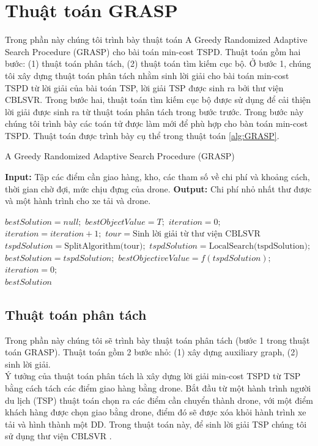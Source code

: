 \documentclass[a4paper,12pt]{report}
\begin{document}
\section{Thuật toán GRASP}
\label{section:grasp}
Trong phần này chúng tôi trình bày thuật toán A Greedy Randomized Adaptive Search Procedure (GRASP) cho bài toán min-cost TSPD. Thuật toán gồm hai bước: (1) thuật toán phân tách, (2) thuật toán tìm kiếm cục bộ. Ở bước 1, chúng tôi xây dựng thuật toán phân tách nhằm sinh lời giải cho bài toán min-cost TSPD từ lời giải của bài toán TSP, lời giải TSP được sinh ra bởi thư viện CBLSVR. Trong bước hai, thuật toán tìm kiếm cục bộ được sử dụng để cải thiện lời giải được sinh ra từ thuật toán phân tách trong bước trước. Trong bước này chúng tôi trình bày các toán tử được làm mới để phù hợp cho bàn toán min-cost TSPD. Thuật toán được trình bày cụ thể trong thuật toán \ref{alg:GRASP}.
\begin{algorithm}[H]
\caption{A Greedy Randomized Adaptive Search Procedure (GRASP)}
\textbf{Input:} Tập các điểm cần giao hàng, kho, các tham số về chi phí và khoảng cách, thời gian chờ đợi, mức chịu đựng của drone.
\textbf{Output:} Chi phí nhỏ nhất thư được và một hành trình cho xe tải và drone.
\begin{algorithmic}[1]
\State $bestSolution=null;$
\State $bestObjectValue=T;$
\State $iteration=0;$
\State $iteration=iteration+1;$
\State $tour=\text{Sinh lời giải từ thư viện CBLSVR}$
\State $tspdSolution=\text{SplitAlgorithm(tour)};$
\State $tspdSolution=\text{LocalSearch(tspdSolution)};$
\State $bestSolution=tspdSolution;$
\State $bestObjectiveValue=f(tspdSolution);$
\State $iteration=0;$
\EndIf
\EndWhile\\
\Return $bestSolution$
\end{algorithmic}
\label{alg:GRASP}
\end{algorithm}
\subsection{Thuật toán phân tách}
Trong phần này chúng tôi sẽ trình bày thuật toán phân tách (bước 1 trong thuật toán GRASP). Thuật toán gồm 2 bước nhỏ: (1) xây dựng auxiliary graph, (2) sinh lời giải. \\

Ý tưởng của thuật toán phân tách là xây dựng lời giải min-cost TSPD từ TSP bằng cách tách các điểm giao hàng bằng drone. Bắt đầu từ một hành trình người du lịch (TSP) thuật toán chọn ra các điểm cần chuyển thành drone, với một điểm khách hàng được chọn giao bằng drone, điểm đó sẽ được xóa khỏi hành trình xe tải và hình thành một DD. Trong thuật toán này, để sinh lời giải \ac{TSP} chúng tôi sử dụng thư viện CBLSVR \cite{CBLSVR}.
\end{document}
